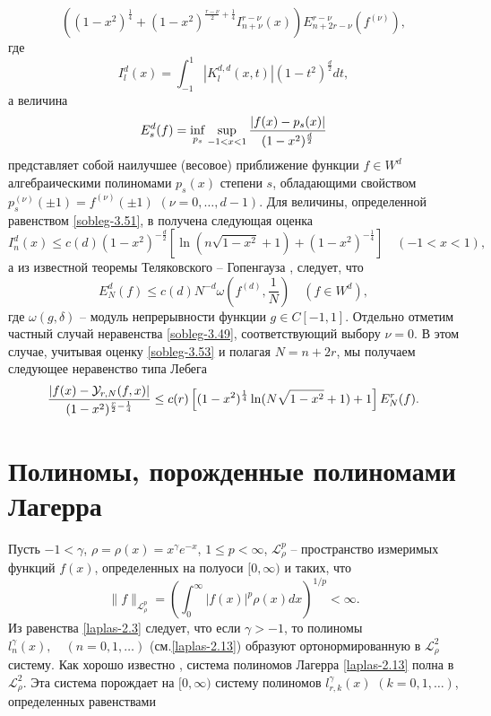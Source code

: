 \begin{equation}\label{sobleg-3.50}
((1-x^2)^\frac14+(1-x^2)^{\frac{r-\nu}{2}+\frac14}I^{r-\nu}_{n+\nu}(x))
E^{r-\nu}_{n+2r-\nu}(f^{(\nu)}),
\end{equation}
где
\begin{equation}\label{sobleg-3.51}
I^{d}_{l}(x)= \int_{-1}^{1}|K^{d,d}_{l}(x,t)|(1-t^2)^{\frac{d}{2}}dt,
\end{equation}
а величина
\begin{equation}\label{sobleg-3.52}
E_s^d(f)=\inf_{p_s}\sup_{-1<x<1}{|f(x)-p_s(x)|\over (1-x^2)^\frac{d}{2}}
\end{equation}
представляет собой наилучшее (весовое) приближение функции $f\in W^d$ алгебраическими полиномами $p_s(x)$ степени
$s$, обладающими свойством $p_s^{(\nu)}(\pm1)=f^{(\nu)}(\pm1)$ $(\nu=0,\ldots, d-1)$. Для величины, определенной равенством  \eqref{sobleg-3.51}, в \cite{sobleg-Shar15} получена следующая оценка
\begin{equation}\label{sobleg-3.53}
I^d_n(x)\le c(d)(1-x^2)^{-\frac{d}{2}}\left[\ln(n\sqrt{1-x^2}+1)+(1-x^2)^{-\frac14}\right]\quad(-1<x<1),
\end{equation}
а из известной теоремы Теляковского -- Гопенгауза \cite{sobleg-TEL},\cite{sobleg-GOP} следует, что
\begin{equation}\label{sobleg-3.54}
E_N^d(f)\le c(d)N^{-d}\omega(f^{(d)},\frac{1}{N})\quad (f\in W^d),
\end{equation}
где $\omega(g,\delta)$ -- модуль непрерывности функции $g\in C[-1,1]$. Отдельно отметим частный случай неравенства \eqref{sobleg-3.49}, соответствующий выбору $\nu=0$. В этом случае,  учитывая оценку \eqref{sobleg-3.53} и полагая $N=n+2r$, мы получаем следующее неравенство типа Лебега
\begin{equation}\label{sobleg-3.55}
{\left|f(x)-\mathcal{ Y}_{r,N}(f,x)\right|
\over(1-x^2)^{\frac{r}{2}-\frac14}}\le c(r)\left[(1-x^2)^{\frac14}\ln(N\sqrt{1-x^2}+1)+1\right]E^{r}_{N}(f).
\end{equation}


\section{Полиномы, порожденные полиномами Лагерра}
Пусть $-1<\gamma$,  $\rho=\rho(x)=x^\gamma e^{-x}$, $1\le p<\infty $,  $\mathcal{ L}_{\rho}^p$ -- пространство измеримых функций $f(x)$, определенных на полуоси $[0,\infty)$ и таких, что
     $$
\|f\|_{\mathcal{ L}_{\rho}^p}=
\left(\int_0^\infty|f(x)|^p\rho(x)dx\right)^{1/p}<\infty.
    $$
Из равенства \eqref{laplas-2.3} следует, что если $\gamma>-1$, то полиномы $l_n^{\gamma}(x),\quad(n=0,1,\ldots)$ (см.\eqref{laplas-2.13})
образуют ортонормированную  в $\mathcal{ L}_\rho^2$  систему. Как хорошо известно \cite{laplas-Sege}, система полиномов Лагерра  \eqref{laplas-2.13} полна в $\mathcal{ L}_\rho^2$.   Эта система порождает на $[0,\infty)$ систему полиномов $l_{r,k}^{\gamma}(x)$ $(k=0,1,\ldots)$, определенных равенствами

